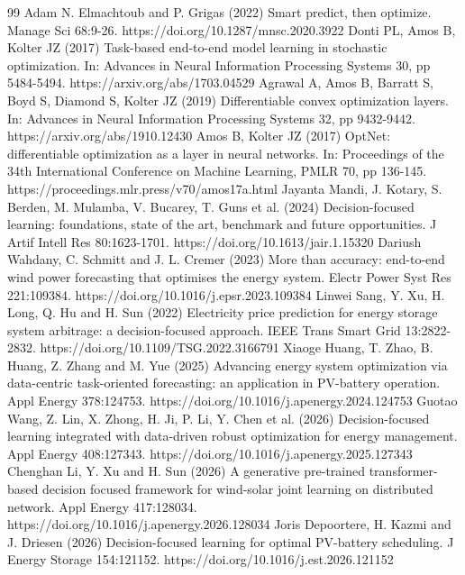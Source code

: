 \documentclass[pdflatex,Numbered,sn-basic]{sn-jnl}
\begin{document}
\begin{thebibliography}{99}
 Adam N. Elmachtoub and P. Grigas (2022) Smart predict, then optimize. Manage Sci 68:9-26. https://doi.org/10.1287/mnsc.2020.3922
 Donti PL, Amos B, Kolter JZ (2017) Task-based end-to-end model learning in stochastic optimization. In: Advances in Neural Information Processing Systems 30, pp 5484-5494. https://arxiv.org/abs/1703.04529
 Agrawal A, Amos B, Barratt S, Boyd S, Diamond S, Kolter JZ (2019) Differentiable convex optimization layers. In: Advances in Neural Information Processing Systems 32, pp 9432-9442. https://arxiv.org/abs/1910.12430
 Amos B, Kolter JZ (2017) OptNet: differentiable optimization as a layer in neural networks. In: Proceedings of the 34th International Conference on Machine Learning, PMLR 70, pp 136-145. https://proceedings.mlr.press/v70/amos17a.html
 Jayanta Mandi, J. Kotary, S. Berden, M. Mulamba, V. Bucarey, T. Guns et al. (2024) Decision-focused learning: foundations, state of the art, benchmark and future opportunities. J Artif Intell Res 80:1623-1701. https://doi.org/10.1613/jair.1.15320
 Dariush Wahdany, C. Schmitt and J. L. Cremer (2023) More than accuracy: end-to-end wind power forecasting that optimises the energy system. Electr Power Syst Res 221:109384. https://doi.org/10.1016/j.epsr.2023.109384
 Linwei Sang, Y. Xu, H. Long, Q. Hu and H. Sun (2022) Electricity price prediction for energy storage system arbitrage: a decision-focused approach. IEEE Trans Smart Grid 13:2822-2832. https://doi.org/10.1109/TSG.2022.3166791
 Xiaoge Huang, T. Zhao, B. Huang, Z. Zhang and M. Yue (2025) Advancing energy system optimization via data-centric task-oriented forecasting: an application in PV-battery operation. Appl Energy 378:124753. https://doi.org/10.1016/j.apenergy.2024.124753
 Guotao Wang, Z. Lin, X. Zhong, H. Ji, P. Li, Y. Chen et al. (2026) Decision-focused learning integrated with data-driven robust optimization for energy management. Appl Energy 408:127343. https://doi.org/10.1016/j.apenergy.2025.127343
 Chenghan Li, Y. Xu and H. Sun (2026) A generative pre-trained transformer-based decision focused framework for wind-solar joint learning on distributed network. Appl Energy 417:128034. https://doi.org/10.1016/j.apenergy.2026.128034
 Joris Depoortere, H. Kazmi and J. Driesen (2026) Decision-focused learning for optimal PV-battery scheduling. J Energy Storage 154:121152. https://doi.org/10.1016/j.est.2026.121152

\end{thebibliography}
\end{document}
